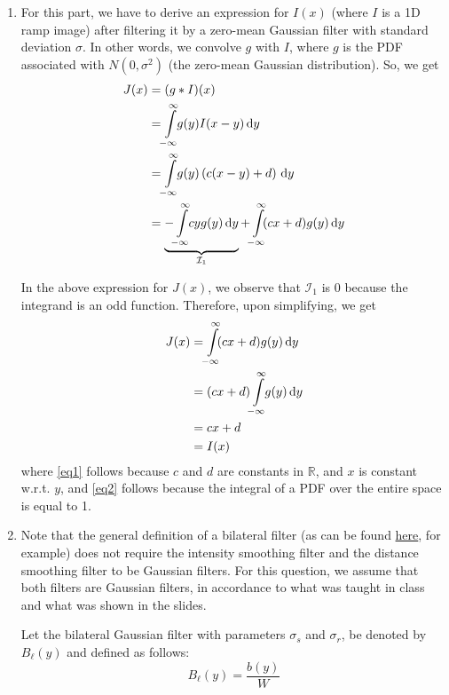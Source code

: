 \documentclass[a4paper]{article}
\newcommand{\R}{\mathbb{R}}
\begin{document}
\begin{enumerate}
\item For this part, we have to derive an expression for $I(x)$ (where $I$ is a 1D ramp image) after filtering it by a zero-mean Gaussian filter with standard deviation $\sigma$. In other words, we convolve $g$ with $I$, where $g$ is the PDF associated with $N(0, \sigma^2)$ (the zero-mean Gaussian distribution). So, we get
\begin{align*}
J(x) &= (g * I)(x) \\
&= \int\limits_{\mathclap{-\infty}}^{\mathclap{\infty}}\! g(y) I (x - y)\, \mathrm{d}y \\
&= \int\limits_{\mathclap{-\infty}}^{\mathclap{\infty}}\! g(y)\left ( c(x - y) + d\right )\, \mathrm{d}y \\
&= \underbrace{-\int\limits_{\mathclap{-\infty}}^{\mathclap{\infty}}\! c y g(y)\, \mathrm{d}y}_{\mathcal{I}_1} + \int\limits_{\mathclap{-\infty}}^{\mathclap{\infty}}\! (cx + d)g(y)\, \mathrm{d}y
\end{align*}

In the above expression for $J(x)$, we observe that $\mathcal{I}_1$ is 0 because the integrand is an odd function. Therefore, upon simplifying, we get
\begin{align}
J(x) &= \int\limits_{\mathclap{-\infty}}^{\mathclap{\infty}}\! (cx + d)g(y)\, \mathrm{d}y \nonumber \\
&=  (cx + d)\int\limits_{\mathclap{-\infty}}^{\mathclap{\infty}}\!g(y)\, \mathrm{d}y \label{eq1} \\
&= cx + d \label{eq2} \\
&= I(x) \nonumber
\end{align}
where \eqref{eq1} follows because $c$ and $d$ are constants in $\R$, and $x$ is constant w.r.t. $y$, and \eqref{eq2} follows because the integral of a PDF over the entire space is equal to 1.

\item Note that the general definition of a bilateral filter (as can be found \href{https://en.wikipedia.org/wiki/Bilateral_filter#Definition}{here}, for example) does not require the intensity smoothing filter and the distance smoothing filter to be Gaussian filters. For this question, we assume that both filters are Gaussian filters, in accordance to what was taught in class and what was shown in the slides.

Let the bilateral Gaussian filter with parameters $\sigma_s$ and $\sigma_r$, be denoted by $B_\ell(y)$ and defined as follows:
\begin{equation*}
B_\ell(y) = \frac{b(y)}{W} 
\end{equation*}


\end{enumerate}
\end{document}

